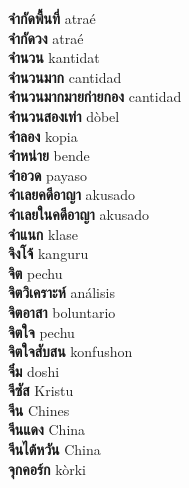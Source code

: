 \textbf{ จำกัดพื้นที่  } atraé \\
\textbf{ จำกัดวง  } atraé \\
\textbf{ จำนวน  } kantidat \\
\textbf{ จำนวนมาก  } cantidad \\
\textbf{ จำนวนมากมายก่ายกอง  } cantidad \\
\textbf{ จำนวนสองเท่า  } dòbel \\
\textbf{ จำลอง  } kopia \\
\textbf{ จำหน่าย  } bende \\
\textbf{ จำอวด  } payaso \\
\textbf{ จำเลยคดีอาญา  } akusado \\
\textbf{ จำเลยในคดีอาญา  } akusado \\
\textbf{ จำแนก  } klase \\
\textbf{ จิงโจ้  } kanguru \\
\textbf{ จิต  } pechu \\
\textbf{ จิตวิเคราะห์  } análisis \\
\textbf{ จิตอาสา  } boluntario \\
\textbf{ จิตใจ  } pechu \\
\textbf{ จิตใจสับสน  } konfushon \\
\textbf{ จิ๋ม  } doshi \\
\textbf{ จีซัส  } Kristu \\
\textbf{ จีน  } Chines \\
\textbf{ จีนแดง  } China \\
\textbf{ จีนไต้หวัน  } China \\
\textbf{ จุกคอร์ก  } kòrki \\
